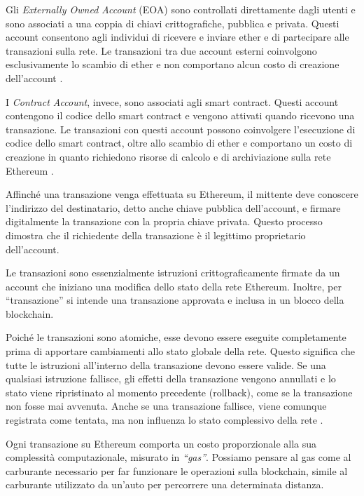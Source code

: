 Gli \textit{Externally Owned Account} (EOA) sono controllati direttamente dagli utenti e sono associati a una coppia di chiavi crittografiche, 
pubblica e privata. Questi account consentono agli individui di ricevere e inviare ether e di partecipare alle transazioni sulla rete. 
Le transazioni tra due account esterni coinvolgono esclusivamente lo scambio di ether e non comportano alcun costo di creazione 
dell’account \cite{ethereumaccounts}.

I \textit{Contract Account}, invece, sono associati agli smart contract. Questi account contengono il codice dello smart contract e vengono 
attivati quando ricevono una transazione. Le transazioni con questi account possono coinvolgere l’esecuzione di codice dello smart 
contract, oltre allo scambio di ether e comportano un costo di creazione in quanto richiedono risorse di calcolo e di archiviazione 
sulla rete Ethereum \cite{ethereumaccounts}. 

Affinché una transazione venga effettuata su Ethereum, il mittente deve conoscere l’indirizzo del destinatario, detto anche chiave 
pubblica dell’account, e firmare digitalmente la transazione con la propria chiave privata. Questo processo dimostra che il richiedente 
della transazione è il legittimo proprietario dell’account.

Le transazioni sono essenzialmente istruzioni crittograficamente firmate da un account che iniziano una modifica dello stato della 
rete Ethereum. Inoltre, per “transazione” si intende una transazione approvata e inclusa in un blocco della blockchain.

Poiché le transazioni sono atomiche, esse devono essere eseguite completamente prima di apportare cambiamenti allo stato globale della 
rete. Questo significa che tutte le istruzioni all’interno della transazione devono essere valide. Se una qualsiasi istruzione fallisce, 
gli effetti della transazione vengono annullati e lo stato viene ripristinato al momento precedente (rollback), come se la transazione 
non fosse mai avvenuta. Anche se una transazione fallisce, viene comunque registrata come tentata, ma non influenza lo stato complessivo 
della rete \cite{ethereumsmartcontracts}.

Ogni transazione su Ethereum comporta un costo proporzionale alla sua complessità computazionale, misurato in \textit{“gas”}. Possiamo pensare al 
gas come al carburante necessario per far funzionare le operazioni sulla blockchain, simile al carburante utilizzato da un’auto per 
percorrere una determinata distanza.

